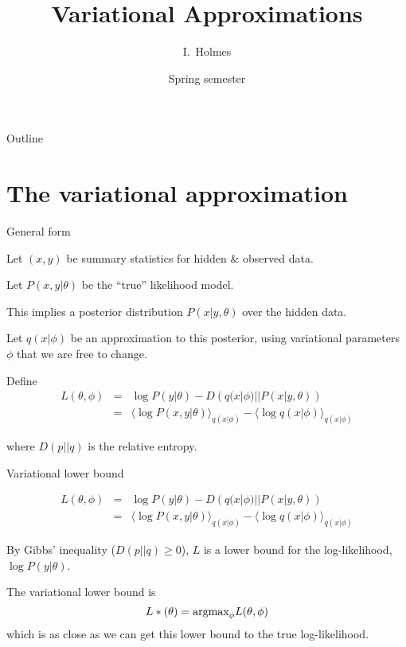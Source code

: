 \documentclass{beamer}
\title[Variational] %
{Variational Approximations}
\author%
{I.~Holmes} %
\institute[University of California, Berkeley] %
{
  Department of Bioengineering\\
  University of California, Berkeley}
\date%
{Spring semester}
\begin{document}
\begin{frame}
  \titlepage
\end{frame}

\begin{frame}{Outline}
  \tableofcontents
\end{frame}

\section{The variational approximation}

\begin{frame}{General form}

Let $(x,y)$ be summary statistics for hidden \& observed data.

Let $P(x,y|\theta)$ be the ``true'' likelihood model.

This implies a posterior distribution $P(x|y,\theta)$ over the hidden data.

Let $q(x|\phi)$ be an approximation to this posterior,
using variational parameters $\phi$
that we are free to change.

Define
\begin{eqnarray*}
L(\theta,\phi) & = & \log P(y|\theta) - D\left(q(x|\phi)||P(x|y,\theta)\right) \\
& = & \langle \log P(x,y|\theta) \rangle_{q(x|\phi)} - \langle \log q(x|\phi) \rangle_{q(x|\phi)}
\end{eqnarray*}

where $D(p||q)$ is the relative entropy.

\end{frame}


\begin{frame}{Variational lower bound}

\begin{eqnarray*}
L(\theta,\phi) & = & \log P(y|\theta) - D\left(q(x|\phi)||P(x|y,\theta)\right) \\
& = & \langle \log P(x,y|\theta) \rangle_{q(x|\phi)} - \langle \log q(x|\phi) \rangle_{q(x|\phi)}
\end{eqnarray*}

By Gibbs' inequality ($D(p||q) \geq 0$), $L$ is a lower bound for the log-likelihood, $\log P(y|\theta)$.

The variational lower bound is
\[
L\ast(\theta) = \mbox{argmax}_{\phi} L(\theta,\phi)
\]
which is as close as we can get this lower bound to the true log-likelihood.

\end{frame}
\end{document}
